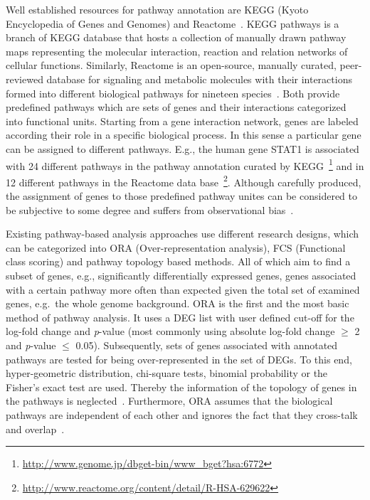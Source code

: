 \documentclass[10pt,a4paper,twocolumn]{article}
\begin{document}
Well established resources for pathway annotation are KEGG (Kyoto
Encyclopedia of Genes and Genomes)\cite{Kegg} and
Reactome~\cite{Reactome}. KEGG pathways is a branch of KEGG database that
hosts a collection of manually drawn pathway maps representing the
molecular interaction, reaction and relation networks of cellular
functions. Similarly, Reactome is an open-source, manually curated,
peer-reviewed database for signaling and metabolic molecules with their
interactions formed into different biological pathways for nineteen
species~\cite{Reactome}. Both provide predefined pathways which are sets of
genes and their interactions categorized into functional units. Starting
from a gene interaction network, genes are labeled according their role in
a specific biological process. In this sense a particular gene can be
assigned to different pathways. E.g., the human gene STAT1 is associated
with 24 different pathways in the pathway annotation curated by
KEGG~\footnote{\url{http://www.genome.jp/dbget-bin/www_bget?hsa:6772}} and
in 12 different pathways in the Reactome data
base~\footnote{\url{http://www.reactome.org/content/detail/R-HSA-629622}}.
Although carefully produced, the assignment of genes to those predefined
pathway unites can be considered to be subjective to some degree and
suffers from observational bias~\cite{schnoes2013biases}.

Existing pathway-based analysis approaches use different research designs,
which can be categorized into ORA (Over-representation analysis), FCS
(Functional class scoring) and pathway topology based methods. All of which
aim to find a subset of genes, e.g., significantly differentially
expressed genes, genes associated with a certain pathway more often than
expected given the total set of examined genes, e.g.~the whole genome
background.  ORA \cite{} is the first and the most basic method of pathway
analysis. It uses a DEG list with user defined cut-off for the log-fold
change and \textit{p}-value (most commonly using absolute log-fold change
$\geq$ 2 and \textit{p}-value $\leq$ 0.05). Subsequently, sets of genes
associated with annotated pathways are tested for being over-represented in
the set of DEGs. To this end, hyper-geometric distribution, chi-square
tests, binomial probability or the Fisher’s exact test are used. Thereby
the information of the topology of genes in the pathways is
neglected~\cite{Bayer}. Furthermore, ORA assumes that the biological
pathways are independent of each other and ignores the fact that they
cross-talk and overlap~\cite{Khatri2012,Campos}.
\end{document}
